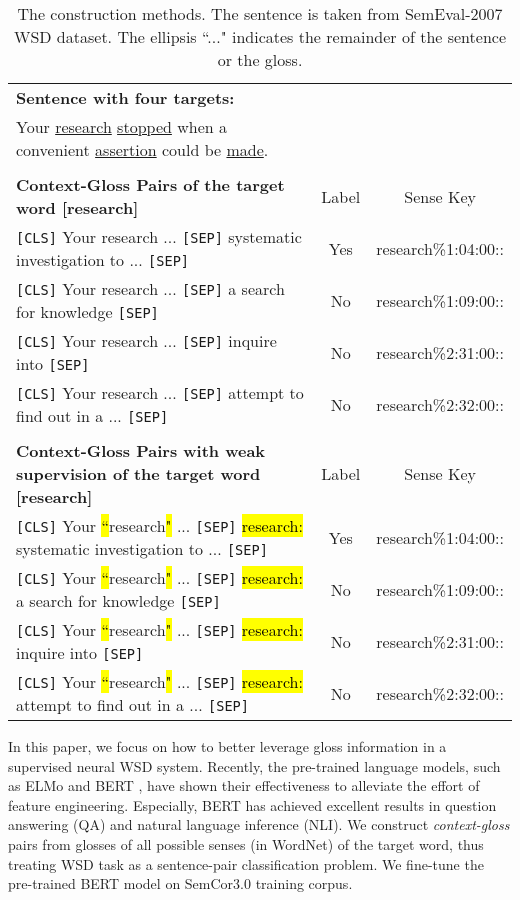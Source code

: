 \documentclass[11pt,a4paper]{article}
\begin{document}
\begin{table*}[t]
    \small
	\centering
	\begin{tabular}{l c c}
		\toprule
        \textbf{Sentence with four targets:}\\
        Your \uline{research} \uline{stopped} when a convenient \uline{assertion} could be \uline{made}. \\
        \\

		\textbf{Context-Gloss Pairs of the target word [research]} & Label & Sense Key \\
		\hline
		\texttt{[CLS]} Your research ... \texttt{[SEP]}	systematic investigation to ... \texttt{[SEP]} & Yes & research\%1:04:00:: \\
        \texttt{[CLS]} Your research ... \texttt{[SEP]} a search for knowledge \texttt{[SEP]} & No & research\%1:09:00::\\
		\texttt{[CLS]} Your research ... \texttt{[SEP]} inquire into \texttt{[SEP]} & No & research\%2:31:00::\\
		\texttt{[CLS]} Your research ... \texttt{[SEP]} attempt to find out in a ... \texttt{[SEP]} & No & research\%2:32:00::\\
		\\
		\textbf{Context-Gloss Pairs with weak supervision of the target word [research]} & Label & Sense Key \\
		\hline
		\texttt{[CLS]} Your \hl{``}research\hl{"} ... \texttt{[SEP]}	\hl{research:} systematic investigation to ... \texttt{[SEP]} & Yes & research\%1:04:00:: \\
        \texttt{[CLS]} Your \hl{``}research\hl{"} ... \texttt{[SEP]}	\hl{research:} a search for knowledge \texttt{[SEP]} & No & research\%1:09:00::\\
		\texttt{[CLS]} Your \hl{``}research\hl{"} ... \texttt{[SEP]}	\hl{research:} inquire into \texttt{[SEP]} & No & research\%2:31:00::\\
		\texttt{[CLS]} Your \hl{``}research\hl{"} ... \texttt{[SEP]}	\hl{research:} attempt to find out in a ... \texttt{[SEP]} & No & research\%2:32:00::\\
		\bottomrule
	\end{tabular}
\caption{\label{example} The construction methods. The sentence is taken from SemEval-2007 WSD dataset. The ellipsis ``..." indicates the remainder of the sentence or the gloss.}
\end{table*}

In this paper, we focus on how to better leverage gloss information in a supervised neural WSD system. Recently, the pre-trained language models, such as ELMo \citep{peters2018deep} and BERT \citep{devlin2018bert}, have shown their effectiveness to alleviate the effort of feature engineering. Especially, BERT has achieved excellent results in question answering (QA) and natural language inference (NLI). We construct \textit{context-gloss} pairs from glosses of all possible senses (in WordNet) of the target word, thus treating WSD task as a sentence-pair classification problem. We fine-tune the pre-trained BERT model on SemCor3.0 training corpus.
\end{document}
